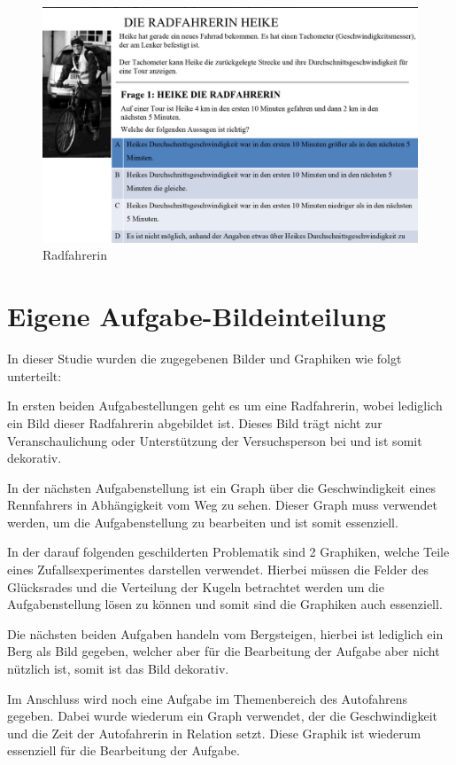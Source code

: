 \begin{figure}[H]
\noindent\hspace{0.5mm}\includegraphics[width=17cm]{./Ressourcen/Radfahrerin.png}
\caption{Radfahrerin}
\end{figure}

\section{Eigene Aufgabe-Bildeinteilung}

In dieser Studie wurden die zugegebenen Bilder und Graphiken wie folgt unterteilt:

In ersten beiden Aufgabestellungen geht es um eine Radfahrerin, wobei lediglich ein Bild dieser Radfahrerin abgebildet ist. Dieses Bild trägt nicht zur Veranschaulichung oder Unterstützung der Versuchsperson bei und ist somit dekorativ. 


In der nächsten Aufgabenstellung ist ein Graph über die Geschwindigkeit eines Rennfahrers in Abhängigkeit vom Weg zu sehen. Dieser Graph muss verwendet werden, um die Aufgabenstellung zu bearbeiten und ist somit essenziell. 


In der darauf folgenden geschilderten Problematik sind 2 Graphiken, welche Teile eines Zufallsexperimentes darstellen verwendet. Hierbei müssen die Felder des Glücksrades und die Verteilung der Kugeln betrachtet werden um die Aufgabenstellung lösen zu können und somit sind die Graphiken auch essenziell.


Die nächsten beiden Aufgaben handeln vom Bergsteigen, hierbei ist lediglich ein Berg als Bild gegeben, welcher aber für die Bearbeitung der Aufgabe aber nicht nützlich ist, somit ist das Bild dekorativ. 


Im Anschluss wird noch eine Aufgabe im Themenbereich des Autofahrens gegeben. Dabei wurde wiederum ein Graph verwendet, der die Geschwindigkeit und die Zeit der Autofahrerin in Relation setzt. Diese Graphik ist wiederum essenziell für die Bearbeitung der Aufgabe. 


